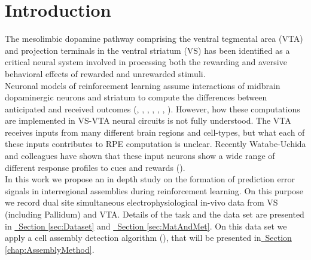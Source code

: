 \chapter{Introduction}
\label{chap:Introduction}
The mesolimbic dopamine pathway comprising the ventral tegmental area (VTA) and projection terminals in the ventral striatum (VS) has been identified as a critical neural system involved in processing both the rewarding and aversive behavioral effects of rewarded and unrewarded stimuli.\\Neuronal models of reinforcement learning assume interactions of midbrain dopaminergic neurons and striatum to compute the differences between anticipated and received outcomes (\cite{Schultz2001}, \cite{Schultz2002}, \cite{Fiorillo}, \cite{Eshel1}, \cite{Pagnoni}, \cite{Radua}, \cite{Takahashi2016}). However, how these computations are implemented in VS-VTA neural circuits is not fully understood. The VTA receives inputs from many different brain regions and cell-types, but what each of these inputs contributes to RPE computation is unclear. Recently Watabe-Uchida and colleagues have shown that these input neurons show a wide range of different response profiles to cues and rewards (\cite{TianHuang}).\\In this work we propose an in depth study on the formation of prediction error signals in interregional assemblies during reinforcement learning. On this purpose we record dual site simultaneous electrophysiological in-vivo data from VS (including Pallidum) and VTA. Details of the task and the data set are presented in \hyperref[sec:Dataset]{~Section \ref*{sec:Dataset}} and \hyperref[sec:MatAndMet]{~Section \ref*{sec:MatAndMet}}. On this data set we apply a cell assembly detection algorithm (\cite{RussoDurstewitz}), that will be presented in\hyperref[chap:AssemblyMethod]{~Section \ref*{chap:AssemblyMethod}}.
